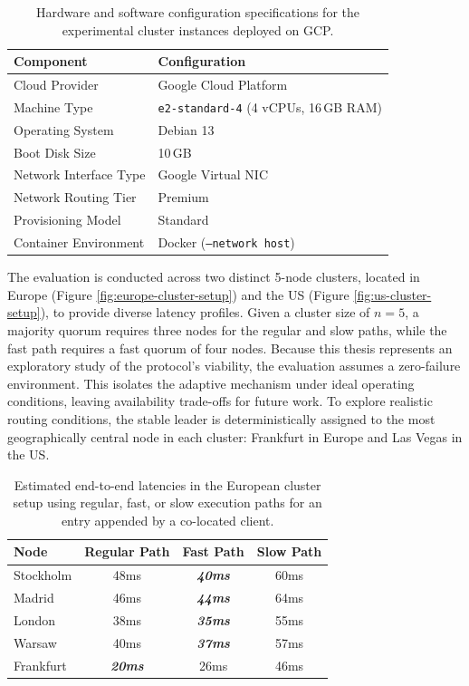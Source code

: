 \begin{table}[t]
\centering
\renewcommand{\arraystretch}{1.2}
\begin{tabular}{ll}
\toprule
\textbf{Component} & \textbf{Configuration} \\
\midrule
Cloud Provider & Google Cloud Platform \\
Machine Type & \texttt{e2-standard-4} (4 vCPUs, 16\,GB RAM) \\
Operating System & Debian 13 \\
Boot Disk Size & 10\,GB \\
Network Interface Type & Google Virtual NIC \\
Network Routing Tier & Premium\\
Provisioning Model & Standard \\
Container Environment & Docker (\texttt{--network host}) \\
\bottomrule
\end{tabular}
\caption{Hardware and software configuration specifications for the experimental cluster instances deployed on GCP.}
\label{tab:hardware-software-setup}
\end{table}

The evaluation is conducted across two distinct 5-node clusters, located in Europe (Figure \ref{fig:europe-cluster-setup}) and the US (Figure \ref{fig:us-cluster-setup}), to provide diverse latency profiles. Given a cluster size of $n=5$, a majority quorum requires three nodes for the regular and slow paths, while the fast path requires a fast quorum of four nodes. Because this thesis represents an exploratory study of the protocol's viability, the evaluation assumes a zero-failure environment. This isolates the adaptive mechanism under ideal operating conditions, leaving availability trade-offs for future work. To explore realistic routing conditions, the stable leader is deterministically assigned to the most geographically central node in each cluster: Frankfurt in Europe and Las Vegas in the US.


\begin{table}[t]
\centering
\renewcommand{\arraystretch}{1.2}
\begin{tabular}{lccc}
\toprule
\textbf{Node} & \textbf{Regular Path} & \textbf{Fast Path} & \textbf{Slow Path} \\
\midrule
Stockholm  & 48ms & \textbf{\textit{40ms}} & 60ms \\
Madrid  & 46ms & \textbf{\textit{44ms}} & 64ms \\
London  & 38ms & \textbf{\textit{35ms}} & 55ms \\
Warsaw  & 40ms & \textbf{\textit{37ms}} & 57ms \\
Frankfurt  & \textbf{\textit{20ms}}  & 26ms & 46ms \\ 
\bottomrule
\end{tabular}
\caption{Estimated end-to-end latencies in the European cluster setup using regular, fast, or slow execution paths for an entry appended by a co-located client.}
\label{tab:cluster-latencies-europe}
\end{table}


